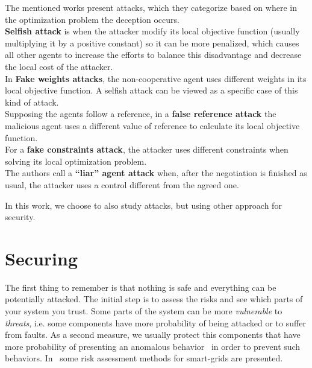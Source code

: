 \documentclass[../main.tex]{subfiles}
\begin{document}
The mentioned works present \fdi{} attacks, which they categorize based on where in the optimization problem the deception occurs.
\\\textbf{Selfish attack} is when the attacker modify its local objective function (usually multiplying it by a positive constant) so it can be more penalized, which causes all other agents to increase the efforts to balance this disadvantage and decrease the local cost of the attacker.
\\In \textbf{Fake weights attacks}, the non-cooperative agent uses different weights in its local objective function. A selfish attack can be viewed as a specific case of this kind of attack.
\\Supposing the agents follow a reference, in a \textbf{false reference attack} the malicious agent uses a different value of reference to calculate its local objective function.
\\For a \textbf{fake constraints attack}, the attacker uses different constraints when solving its local optimization problem.
\\The authors call a \textbf{``liar'' agent attack} when, after the negotiation is finished as usual, the attacker uses a control different from the agreed one.

In this work, we choose to also study \fdi{} attacks, but using other approach for security.
\section{Securing \cps{}}\label{sec:maintaining_security}
The first thing to remember is that nothing is safe and everything can be potentially attacked.
The initial step is to assess the risks and see which parts of your system you trust.
Some parts of the system can be more \emph{vulnerable} to \emph{threats}, i.e. some components have more probability of being attacked or to suffer from faults.
As a second measure, we usually protect this components that have more probability of presenting an anomalous behavior~\cite{Bishop2005} in order to prevent such behaviors.
In~\cite{WangLu2013} some risk assessment methods for smart-grids are presented.
\end{document}
